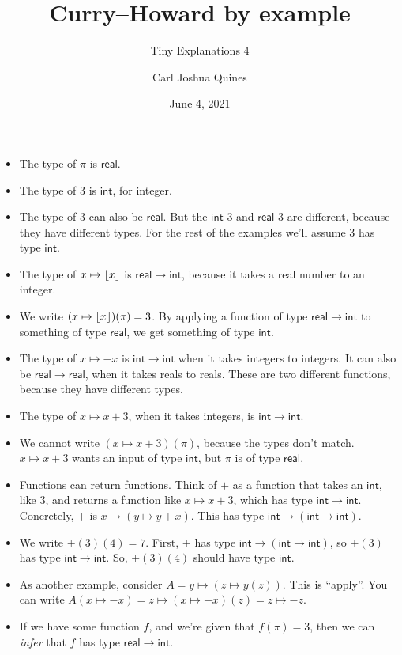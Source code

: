 \documentclass[11pt,paper=letter]{scrartcl}
\renewcommand{\sf}{\mathsf}
\begin{document}
\title{Curry--Howard by example}
\subtitle{Tiny Explanations 4}
\author{Carl Joshua Quines}
\date{June 4, 2021}

\maketitle

\begin{itemize}[leftmargin=*]
\item The type of $\pi$ is $\sf{real}$.
\item The type of $3$ is $\sf{int}$, for integer.
\item The type of $3$ can also be $\sf{real}$. But the $\sf{int}$ $3$ and $\sf{real}$ $3$ are different, because they have different types. For the rest of the examples we'll assume $3$ has type $\sf{int}$.
\item The type of $x \mapsto \left\lfloor x \right\rfloor$ is $\sf{real} \to \sf{int}$, because it takes a real number to an integer.
\item We write $(x \mapsto \left\lfloor x \right\rfloor)(\pi) = 3$. By applying a function of type $\sf{real} \to \sf{int}$ to something of type $\sf{real}$, we get something of type $\sf{int}$.
\item The type of $x \mapsto -x$ is $\sf{int} \to \sf{int}$ when it takes integers to integers. It can also be $\sf{real} \to \sf{real}$, when it takes reals to reals. These are two different functions, because they have different types.
\item The type of $x \mapsto x + 3$, when it takes integers, is $\sf{int} \to \sf{int}$.
\item We cannot write $(x \mapsto x + 3)(\pi)$, because the types don't match. $x \mapsto x + 3$ wants an input of type $\sf{int}$, but $\pi$ is of type $\sf{real}$.
\item Functions can return functions. Think of $+$ as a function that takes an $\sf{int}$, like $3$, and returns a function like $x \mapsto x+3$, which has type $\sf{int} \to \sf{int}$. Concretely, $+$ is $x \mapsto (y \mapsto y + x)$. This has type $\sf{int} \to (\sf{int} \to \sf{int})$.
\item We write $+(3)(4) = 7$. First, $+$ has type $\sf{int} \to (\sf{int} \to \sf{int})$, so $+(3)$ has type $\sf{int} \to \sf{int}$. So, $+(3)(4)$ should have type $\sf{int}$.
\item As another example, consider $A = y \mapsto (z \mapsto y(z))$. This is ``apply''. You can write $A(x \mapsto -x) = z \mapsto (x \mapsto -x)(z) = z \mapsto -z$.
\item If we have some function $f$, and we're given that $f(\pi) = 3$, then we can \emph{infer} that $f$ has type $\sf{real} \to \sf{int}$.

\end{itemize}
\end{document}
